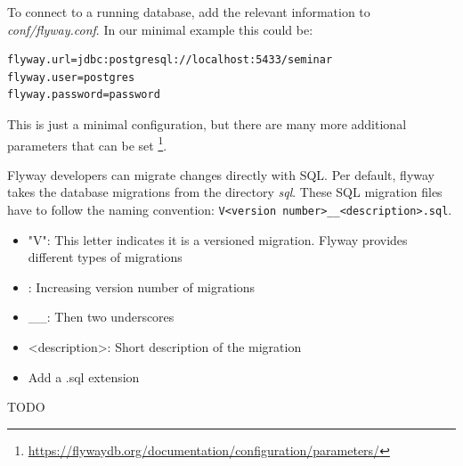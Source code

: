 %
To connect to a running database, add the relevant information to \textit{conf/flyway.conf}.
In our minimal example this could be:

\begin{lstlisting}[caption=Minimal configuration]
flyway.url=jdbc:postgresql://localhost:5433/seminar
flyway.user=postgres
flyway.password=password
\end{lstlisting}

This is just a minimal configuration, but there are many more additional parameters that can be set \footnote{\url{https://flywaydb.org/documentation/configuration/parameters/}}.

%
Flyway developers can migrate changes directly with SQL. Per default, flyway takes the database migrations from the directory \textit{sql}.
These SQL migration files have to follow the naming convention: \texttt{V<version number>\_\_<description>.sql}.

\begin{itemize}
    \item "V": This letter indicates it is a versioned migration. Flyway provides different types of migrations
    \item <version number>: Increasing version number of migrations
    \item \_\_: Then two underscores
    \item <description>: Short description of the migration
    \item Add a .sql extension
\end{itemize}

%
TODO

\newpage